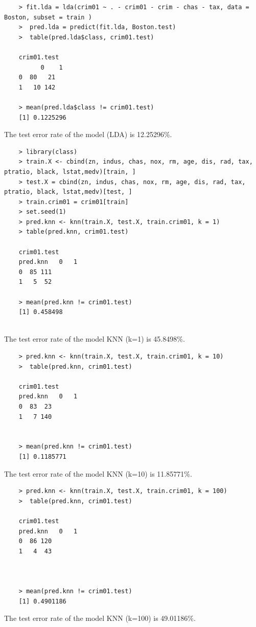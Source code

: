 \documentclass{article}
\begin{document}
\begin{program}
	\begin{verbatim}
	> fit.lda = lda(crim01 ~ . - crim01 - crim - chas - tax, data = Boston, subset = train )
	>  pred.lda = predict(fit.lda, Boston.test)
	>  table(pred.lda$class, crim01.test)
	
	crim01.test
	      0    1
	0  80   21
	1   10 142
		
	> mean(pred.lda$class != crim01.test)
	[1] 0.1225296	
	\end{verbatim}
\end{program}
The test error rate of the model (LDA)  is 12.25296\%.

\newpage

\begin{program}
	\begin{verbatim}
	> library(class)
	> train.X <- cbind(zn, indus, chas, nox, rm, age, dis, rad, tax, ptratio, black, lstat,medv)[train, ]
	> test.X = cbind(zn, indus, chas, nox, rm, age, dis, rad, tax, ptratio, black, lstat,medv)[test, ]
	> train.crim01 = crim01[train]
	> set.seed(1)
	> pred.knn <- knn(train.X, test.X, train.crim01, k = 1)
	> table(pred.knn, crim01.test)
	
	crim01.test
	pred.knn   0   1
	0  85 111
	1   5  52
	
	> mean(pred.knn != crim01.test)
	[1] 0.458498
	
	\end{verbatim}
\end{program}
The test error rate of the model KNN (k=1)  is 45.8498\%.


\begin{program}
	\begin{verbatim}
	> pred.knn <- knn(train.X, test.X, train.crim01, k = 10)
	>  table(pred.knn, crim01.test)

	crim01.test
	pred.knn   0   1
	0  83  23
	1   7 140


	> mean(pred.knn != crim01.test)
	[1] 0.1185771	
	\end{verbatim}
\end{program}
The test error rate of the model KNN (k=10)  is 11.85771\%.



\begin{program}
	\begin{verbatim}
	> pred.knn <- knn(train.X, test.X, train.crim01, k = 100)
	>  table(pred.knn, crim01.test)
	
	crim01.test
	pred.knn   0   1
	0  86 120
	1   4  43
	
	
	
	> mean(pred.knn != crim01.test)
	[1] 0.4901186	
	\end{verbatim}
\end{program}
The test error rate of the model KNN (k=100)  is 49.01186\%.
\end{document}
